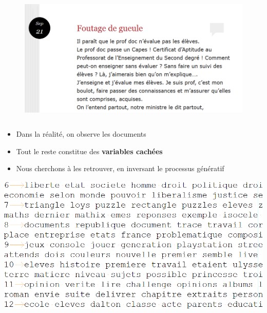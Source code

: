 \documentclass[11pt]{beamer}
\begin{document}
\begin{frame}
\begin{columns}
\begin{column}{0.65\linewidth}
\centering
\begin{figure}
\includegraphics[width=\textwidth]{./blogaladoc.png}
\end{figure}
\end{column}

\end{columns}

\begin{itemize}
\item Dans la réalité, on observe les documents
\pause
\item Tout le reste constitue des \textbf{variables cachées}
\item Nous cherchons à les retrouver, en inversant le processus génératif
\end{itemize}
\end{frame}

\begin{frame}

\vspace{1.5cm}

\includegraphics[scale=0.2]{code4-clefs.png}

\end{frame}
\end{document}
